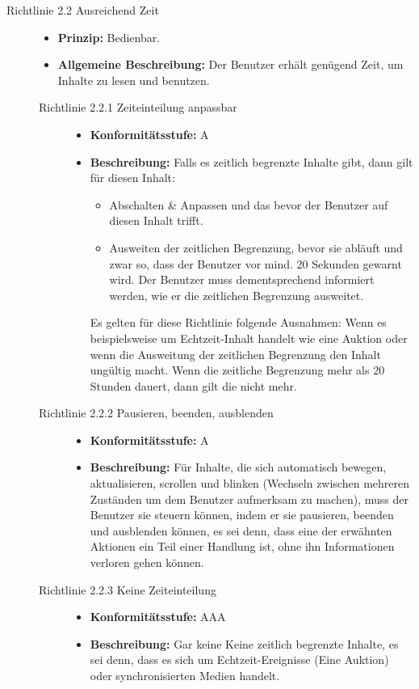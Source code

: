 \begin{description}
	\item[Richtlinie 2.2 Ausreichend Zeit]\hfill
	\begin{itemize}
		\item \textbf{Prinzip:} Bedienbar.
		\item \textbf{Allgemeine Beschreibung:} Der Benutzer erhält genügend Zeit, um Inhalte zu lesen und benutzen.
	\end{itemize}
	
	\begin{description}
		\item[Richtlinie 2.2.1 Zeiteinteilung anpassbar]\hfill
		\begin{itemize}
			\item \textbf{Konformitätsstufe:} A
			\item \textbf{Beschreibung:} Falls es zeitlich begrenzte Inhalte gibt, dann gilt für diesen Inhalt:
			\begin{itemize}
				\item Abschalten \& Anpassen und das bevor der Benutzer auf diesen Inhalt trifft.
				\item Ausweiten der zeitlichen Begrenzung, bevor sie abläuft und zwar so, dass der Benutzer vor mind. 20 Sekunden gewarnt wird. Der Benutzer muss 
				dementsprechend informiert werden, wie er die zeitlichen Begrenzung ausweitet.
			\end{itemize}
			Es gelten für diese Richtlinie folgende Ausnahmen: Wenn es beispielsweise um Echtzeit-Inhalt handelt wie eine Auktion oder wenn die Ausweitung 
			der zeitlichen Begrenzung den Inhalt ungültig macht. Wenn die zeitliche Begrenzung mehr als 20 Stunden dauert, dann gilt die nicht mehr.
		\end{itemize}
		
		\item[Richtlinie 2.2.2 Pausieren, beenden, ausblenden]\hfill
		\begin{itemize}
			\item \textbf{Konformitätsstufe:} A
			\item \textbf{Beschreibung:} Für Inhalte, die sich automatisch bewegen, aktualisieren, scrollen und blinken (Wechseln zwischen mehreren Zuständen um dem 
			Benutzer aufmerksam zu machen), muss der Benutzer sie steuern können, indem er sie pausieren, beenden und ausblenden können, es sei denn, dass eine der 
			erwähnten Aktionen ein Teil einer Handlung ist, ohne ihn Informationen verloren gehen können.
		\end{itemize}
		
		\item[Richtlinie 2.2.3 Keine Zeiteinteilung]\hfill
		\begin{itemize}
			\item \textbf{Konformitätsstufe:} AAA
			\item \textbf{Beschreibung:} Gar keine Keine zeitlich begrenzte Inhalte, es sei denn, dass es sich um Echtzeit-Ereignisse (Eine Auktion) oder  
			synchronisierten Medien handelt.
		\end{itemize}
		

\end{description}
\end{description}
